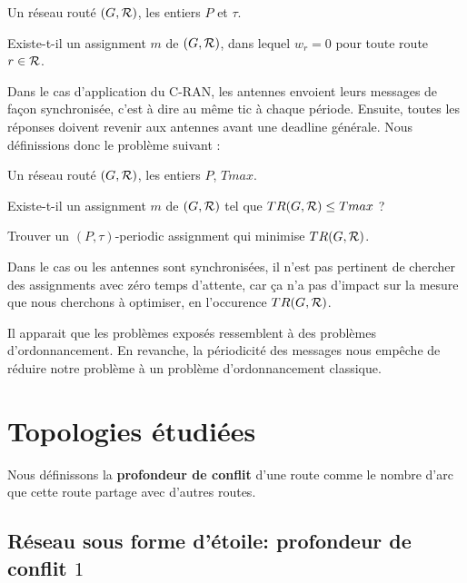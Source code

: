 \documentclass{article}
\begin{document}
        Un réseau routé $(G,{\cal R})$, les entiers $P$ et $\tau$.
      
       Existe-t-il un assignment $m$ de $(G,{\cal R})$, dans lequel $w_r = 0$ pour toute route $r \in {\cal R}$.

Dans le cas d'application du C-RAN, les antennes envoient leurs messages de façon synchronisée, c'est à dire au même tic à chaque période. Ensuite, toutes les réponses doivent revenir aux  antennes avant une deadline générale.
Nous définissions donc le problème suivant :
       

        Un réseau routé $(G,{\cal R})$, les entiers $P$, $Tmax$.
      
       Existe-t-il un assignment $m$ de $(G,{\cal R})$ tel que $ TR(G,{\cal R}) \leq Tmax$ ?

       Trouver un $(P,\tau)$-periodic assignment qui minimise  $TR(G,{\cal R})$.
    
Dans le cas ou les antennes sont synchronisées, il n'est pas pertinent de chercher des assignments avec zéro temps d'attente, car ça n'a pas d'impact sur la mesure que nous cherchons à optimiser, en l'occurence $TR(G,{\cal R})$.

Il apparait que les problèmes exposés ressemblent à des problèmes d'ordonnancement. En revanche, la périodicité des messages nous empêche de réduire notre problème à un problème d'ordonnancement classique.
  
\section{Topologies étudiées}
Nous définissons la {\bf profondeur de conflit} d'une route comme le nombre d'arc que cette route partage avec d'autres routes.

  \subsection{Réseau sous forme d'étoile: profondeur de conflit $1$}
	
\end{document}
